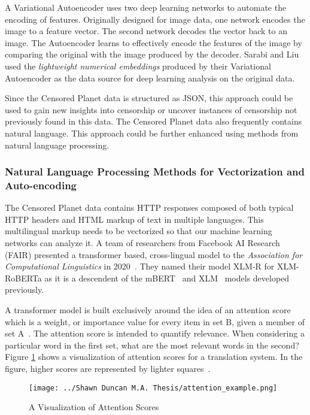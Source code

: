 A Variational Autoencoder uses two deep learning networks to automate the
encoding of features.  Originally designed for image data, one network encodes
the image to a feature vector.  The second network decodes the vector back to
an image.  The Autoencoder learns to effectively encode the features of the
image by comparing the original with the image produced by the decoder.  Sarabi
and Liu used the \textit{lightweight numerical embeddings} produced by their
Variational Autoencoder as the data source for deep learning analysis on the
original data.

Since the Censored Planet data is structured as JSON, this approach could be
used to gain new insights into censorship or uncover instances of censorship
not previously found in this data. The Censored Planet data also frequently
contains natural language. This approach could be further enhanced using
methods from natural language processing.

\subsubsection{Natural Language Processing Methods for Vectorization and Auto-encoding}

The Censored Planet data contains HTTP responses composed of both typical HTTP
headers and HTML markup of text in multiple languages. This multilingual markup
needs to be vectorized so that our machine learning networks can analyze it. A
team of researchers from Facebook AI Research (FAIR) presented a transformer
based, cross-lingual model to the \textit{Association for Computational
Linguistics} in 2020~\cite{conneau_unsupervised_2020}. They named their model
XLM-R for XLM-RoBERTa as it is a descendent of the
mBERT~\cite{devlin_bert_2019} and XLM~\cite{conneau_cross-lingual_2019} models
developed previously.

A transformer model is built exclusively around the idea of an attention score
which is a weight, or importance value for every item in set B, given a member
of set A~\cite{galassi_attention_2021}.  The attention score is intended to
quantify relevance.  When considering a particular word in the first set, what
are the most relevant words in the second? Figure \ref{fig:atten} shows a
visualization of attention scores for a translation system.  In the figure,
higher scores are represented by lighter squares~\cite{bahdanau_neural_2016}.

\begin{figure}[hbt]
    \centering
    \texttt{[image: ../Shawn Duncan M.A. Thesis/attention\_example.png]}
    \caption{A Visualization of Attention Scores~\cite{bahdanau_neural_2016}}
    \label{fig:atten}
\end{figure}

